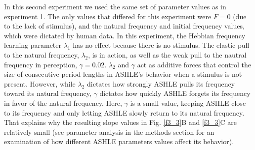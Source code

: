 \documentclass{report}
\begin{document}
In this second experiment we used the same set of parameter values as in experiment 1. The only values that differed for this experiment were $F = 0$ (due to the lack of stimulus), and the natural frequency and initial frequency values, which were dictated by human data. In this experiment, the Hebbian frequency learning parameter $\lambda_1$ has no effect because there is no stimulus. The elastic pull to the natural frequency, $\lambda_2$, is in action, as well as the weak pull to the nautral frequency in perception, $\gamma = 0.02$. $\lambda_2$ and $\gamma$ act as additive forces that control the size of consecutive period lengths in ASHLE's behavior when a stimulus is not present. However, while $\lambda_2$ dictates how strongly ASHLE pulls its frequency toward its natural frequency, $\gamma$ dictates how quickly ASHLE forgets its frequency in favor of the natural frequency. Here, $\gamma$ is a small value, keeping ASHLE close to its frequency and only letting ASHLE slowly return to its natural frequency. That explains why the resulting slope values in Fig.{} \ref{f3_3}B and \ref{f3_3}C are relatively small (see parameter analysis in the methods section for an examination of how different ASHLE parameters values affect its behavior).
\end{document}
